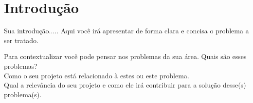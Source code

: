 \section{Introdução}
\label{sec::introducao}
Sua introdução.....
Aqui você irá apresentar de forma clara e concisa o problema a ser tratado.

Para contextualizar você pode pensar nos problemas da sua área. Quais são esses problemas?\\
Como o seu projeto está relacionado à estes ou este problema.\\
Qual a relevância do seu projeto e como ele irá contribuir para a solução desse(s) problema(s).


